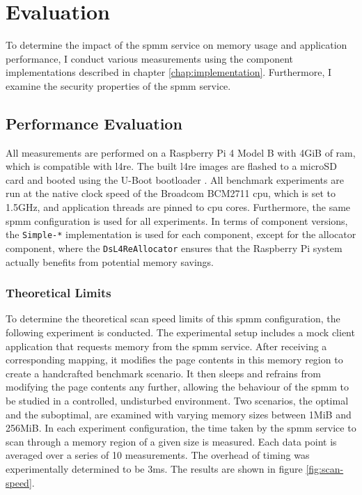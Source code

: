 \chapter{Evaluation}
\label{chap:evaluation}

To determine the impact of the \ac{spmm} service on memory usage and application performance, I conduct various measurements using the component implementations described in chapter \ref{chap:implementation}.
Furthermore, I examine the security properties of the \ac{spmm} service.

\section{Performance Evaluation}
\label{sec:performance-evaluation}

All measurements are performed on a Raspberry Pi 4 Model B with 4GiB of \acs{ram}, which is compatible with \ac{l4re}.
The built \ac{l4re} images are flashed to a microSD card and booted using the U-Boot bootloader \cite{u-boot}.
All benchmark experiments are run at the native clock speed of the Broadcom BCM2711 \acs{cpu}, which is set to 1.5GHz, and application threads are pinned to \acs{cpu} cores.
Furthermore, the same \ac{spmm} configuration is used for all experiments.
In terms of component versions, the \texttt{Simple-*} implementation is used for each component, except for the allocator component, where the \texttt{Ds\-L4Re\-Allocator} ensures that the Raspberry Pi system actually benefits from potential memory savings.

\subsection{Theoretical Limits}
\label{subsec:theoretical-limits}

To determine the theoretical scan speed limits of this \ac{spmm} configuration, the following experiment is conducted.
The experimental setup includes a mock client application that requests memory from the \ac{spmm} service.
After receiving a corresponding mapping, it modifies the page contents in this memory region to create a handcrafted benchmark scenario.
It then sleeps and refrains from modifying the page contents any further, allowing the behaviour of the \ac{spmm} to be studied in a controlled, undisturbed environment.
Two scenarios, the optimal and the suboptimal, are examined with varying memory sizes between 1MiB and 256MiB.
In each experiment configuration, the time taken by the \ac{spmm} service to scan through a memory region of a given size is measured.
Each data point is averaged over a series of 10 measurements.
The overhead of timing was experimentally determined to be 3ms.
The results are shown in figure \ref{fig:scan-speed}.

